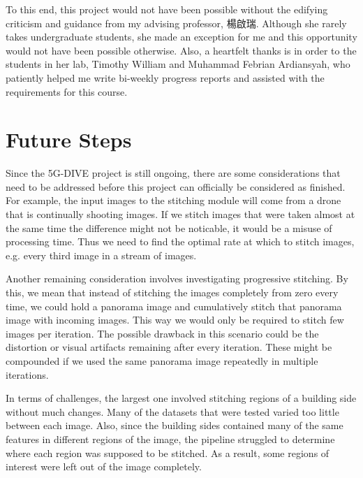 \documentclass[12pt, a4paper]{article}
\begin{document}
To this end, this project would not have been possible without the edifying criticism and 
guidance from my advising professor, 楊啟瑞. Although she rarely takes undergraduate 
students, she made an exception for me and this opportunity would not have been possible 
otherwise. Also, a heartfelt thanks is in order to the students in her lab, Timothy William and
Muhammad Febrian Ardiansyah, who patiently helped me write bi-weekly progress reports and 
assisted with the requirements for this course.

\section{Future Steps}
\label{sec:FutureSteps}
Since the 5G-DIVE project is still ongoing, there are some considerations that need to be 
addressed before this project can officially be considered as finished. For example, the input
images to the stitching module will come from a drone that is continually shooting images. 
If we stitch images that were taken almost at the same time the difference might not be 
noticable, it would be a misuse of processing time. Thus we need to find the optimal rate 
at which to stitch images, e.g. every third image in a stream of images. 

Another remaining consideration involves investigating progressive stitching. By this, we mean
that instead of stitching the images completely from zero every time, we could hold a panorama
image and cumulatively stitch that panorama image with incoming images. This way we would only
be required to stitch few images per iteration. The possible drawback in this scenario could
be the distortion or visual artifacts remaining after every iteration. These might be compounded
if we used the same panorama image repeatedly in multiple iterations.

In terms of challenges, the largest one involved stitching regions of a building side without
much changes. Many of the datasets that were tested varied too little between each image. 
Also, since the building sides contained many of the same features in different regions of the 
image, the pipeline struggled to determine where each region was supposed to be stitched. As
a result, some regions of interest were left out of the image completely.
\vspace{\fill}

\erintbibliography
\end{document}
